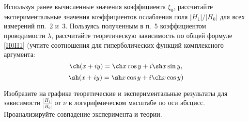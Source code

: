 \begin{lab:task}
\item Используя ранее вычисленные значения коэффициента $\xi_0$,
рассчитайте экспериментальные значения коэффициентов 
ослабления поля $|H_1|/|H_0|$ для всех измерений пп.~2 и~3.
Пользуясь полученным в п.~5 коэффициентом проводимости $\lambda$,
рассчитайте теоретическую зависимость по общей формуле \eqref{H0H1}
(учтите соотношения для гиперболических функций комплексного аргумента: 
\[\ch(x+iy) = \ch x \cos y + i \sh x \sin y,
\] 
\[\sh(x+iy) = \sh x \cos y + i \ch x \cos y)
\]

Изобразите на графике теоретические и экспериментальные 
результаты для зависимости $\frac{|H_1|}{|H_0|}$ от $\nu$
в логарифмическом масштабе по оси абсцисс.
Проанализируйте совпадение эксперимента и теории.


\end{lab:task}


